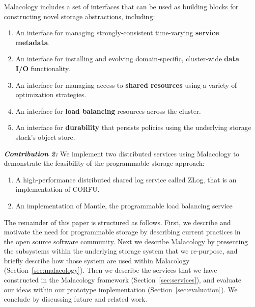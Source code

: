 Malacology includes a set of interfaces that can be used as
building blocks for constructing novel storage abstractions, including:

\begin{enumerate}

\item An interface for managing strongly-consistent time-varying \textbf{service
metadata}.

\item An interface for installing and evolving domain-specific, cluster-wide
\textbf{data I/O} functionality.

\item An interface for managing access to \textbf{shared resources} using a
variety of optimization strategies.

\item An interface for \textbf{load balancing} resources across the cluster.

\item An interface for \textbf{durability} that persists policies using the
underlying storage stack's object store.

\end{enumerate}

{\it \textbf{Contribution 2:}} We implement two distributed services using
Malacology to demonstrate the feasibility of the programmable storage approach:

\begin{enumerate}

\item A high-performance distributed shared log service called ZLog, that is an
implementation of CORFU.~\cite{balakrishnan_corfu_2012}

\item An implementation of Mantle, the programmable load balancing
service~\cite{sevilla:sc15-mantle}

\end{enumerate}

The remainder of this paper is structured as follows. First, we describe and
motivate the need for programmable storage by describing current practices in
the open source software community. Next we describe Malacology by presenting
the subsystems within the underlying storage system that we re-purpose, and
briefly describe how those system are used within Malacology
(Section~\ref{sec:malacology}).  Then we describe the services that we have
constructed in the Malacology framework (Section~\ref{sec:services}), and
evaluate our ideas within our prototype implementation
(Section~\ref{sec:evaluation}).  We conclude by discussing future and related work.
